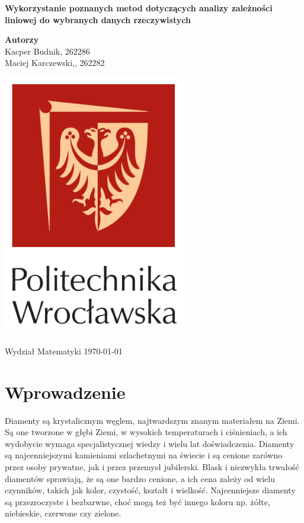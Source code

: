 \documentclass[12pt,leqno]{article}
\theoremstyle{exer}
\begin{document}
	\begin{titlepage}
		\begin{center}
			
			\textbf{\Huge  Wykorzystanie poznanych metod dotyczących analizy zależności liniowej
				do wybranych danych rzeczywistych}
			
			\vspace{0.5cm}
			
			\vspace{1.5cm}
			
			\textbf{\LARGE Autorzy}\\
			\vspace{0.5cm}
			\large Kacper Budnik, 262286\\
			\large Maciej Karczewski,, 262282\\
			
			
			\vfill
			
			\vspace{0.4cm}
			
			\includegraphics[width=0.60\textwidth]{images/logo.PNG}
			
			\vspace{0.8cm}
			Wydział Matematyki	
			\today
		\end{center}
	\end{titlepage}
	\tableofcontents
	\newpage
	
	\section{Wprowadzenie}
	Diamenty są krystalicznym węglem, najtwardszym znanym materiałem na Ziemi. Są one tworzone w głębi Ziemi, w wysokich temperaturach i ciśnieniach, a ich wydobycie wymaga specjalistycznej wiedzy i wielu lat doświadczenia. Diamenty są najcenniejszymi kamieniami szlachetnymi na świecie i są cenione zarówno przez osoby prywatne, jak i przez przemysł jubilerski. Blask i niezwykła trwałość diamentów sprawiają, że są one bardzo cenione, a ich cena zależy od wielu czynników, takich jak kolor, czystość, kształt i wielkość. Najcenniejsze diamenty są przezroczyste i bezbarwne, choć mogą też być innego koloru np.  żółte, niebieskie, czerwone czy zielone.
	
\end{document}
